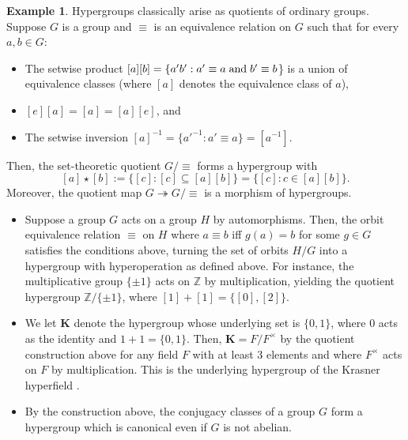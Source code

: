 \documentclass[reqno]{amsart}
\newcommand{\Z}{\mathbb{Z}}
\newcommand{\K}{\mathbf{K}}
\numberwithin{equation}{section}
\theoremstyle{plain}
\theoremstyle{definition}
\newtheorem{example}[equation]{Example}
\begin{document}
\begin{example}
Hypergroups classically arise as quotients of ordinary groups. Suppose $G$ is a group and $\equiv$ is an equivalence relation on $G$ such that for every $a, b\in G$:
    \begin{itemize}
        \item The setwise product $[a][b] = \{a'b' : a' \equiv a \hspace{1mm} \text{and} \hspace{1mm} b'\equiv b$\} is a union of equivalence classes (where $[a]$ denotes the equivalence class of $a$),
        \item $[e][a] = [a] = [a][e]$, and
        \item The setwise inversion $[a]^{-1} = \{a'^{-1}: a' \equiv a\} = [a^{-1}]$.
        \end{itemize}
Then, the set-theoretic quotient $G/\!\!\equiv$ forms a hypergroup with 
$$
[a]\star [b] := \{[c] : [c]\subseteq [a][b]\}=\{[c]: c\in [a][b]\}.
$$
Moreover, the quotient map $G\twoheadrightarrow  G/\!\!\equiv$ is a morphism of hypergroups.

\begin{itemize}
    \item Suppose a group $G$ acts on a group $H$ by automorphisms. Then, the orbit equivalence relation $\equiv$ on $H$ where $a\equiv b$ iff $g(a)=b$ for some $g\in G$ satisfies the conditions above, turning the set of orbits $H/G$ into a hypergroup with hyperoperation as defined above. For instance, the multiplicative group $\{\pm 1\}$ acts on $\Z$ by multiplication, yielding the quotient hypergroup $\Z /\{\pm 1\}$, where $[1]+[1] = \{[0], [2]\}$.
    \item We let $\K$ denote the hypergroup whose underlying set is $\{0, 1\}$, where 0 acts as the identity and $1+1=\{0, 1\}$. Then, $\K = F/F^\times$ by the quotient construction above for any field $F$ with at least 3 elements and where $F^\times$ acts on $F$ by multiplication. This is the underlying hypergroup of the Krasner hyperfield \cite{Krasner}.
    \item   By the construction above, the conjugacy classes of a group $G$ form a hypergroup which is canonical even if $G$ is not abelian.
\end{itemize}
\end{example}
\end{document}
